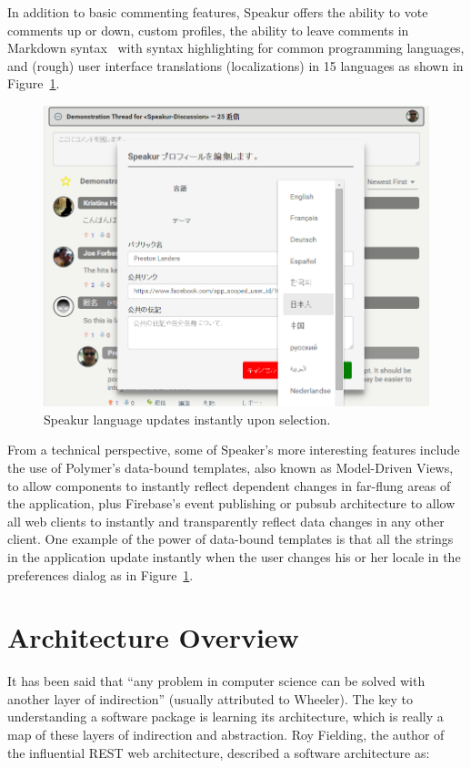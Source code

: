 In addition to basic commenting features, Speakur offers the ability to vote comments up or down, custom profiles, 
the ability to leave comments in Markdown syntax~\cite{githubcontributors2015} with syntax highlighting for common programming languages, 
and (rough) user interface translations 
(localizations) 
in 15 languages as shown in Figure~\ref{f:lang}.

\begin{figure}[htb]
\centering
 \includegraphics[width=5.5in]{images/screenshot_20150320_1923_lang.png}
\caption{Speakur language updates instantly upon selection.}
\label{f:lang}
\end{figure}


From a technical perspective, some of Speaker's more interesting features include the use of Polymer's data-bound templates, also known as Model-Driven Views, 
to allow components to instantly reflect dependent changes in far-flung areas of the application,
plus Firebase's event publishing or pubsub architecture to allow all web clients to instantly and transparently reflect data changes in any other client.
One example of the power of data-bound templates is that all the strings in the application update instantly when the user changes his or her locale in the preferences dialog as in Figure~\ref{f:lang}.

\section{Architecture Overview}
It has been said that ``any problem in computer science can be solved with another layer of indirection'' (usually attributed to Wheeler).
The key to understanding a software package is learning its architecture,
which is really a map of these layers of indirection and abstraction.
Roy Fielding, the author of the influential REST web architecture, described a software architecture as:

